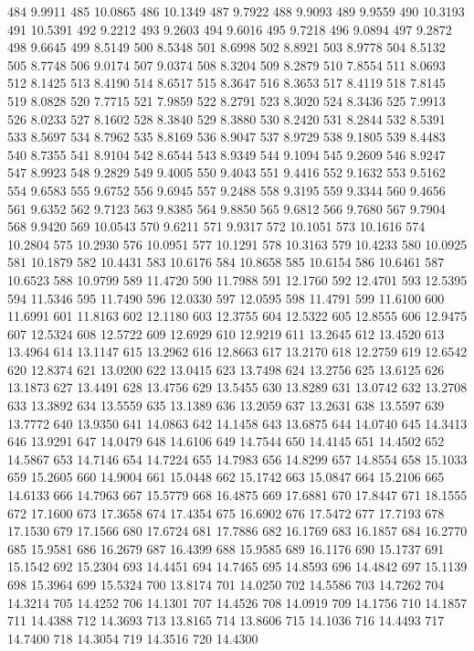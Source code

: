 484 9.9911
485 10.0865
486 10.1349
487 9.7922
488 9.9093
489 9.9559
490 10.3193
491 10.5391
492 9.2212
493 9.2603
494 9.6016
495 9.7218
496 9.0894
497 9.2872
498 9.6645
499 8.5149
500 8.5348
501 8.6998
502 8.8921
503 8.9778
504 8.5132
505 8.7748
506 9.0174
507 9.0374
508 8.3204
509 8.2879
510 7.8554
511 8.0693
512 8.1425
513 8.4190
514 8.6517
515 8.3647
516 8.3653
517 8.4119
518 7.8145
519 8.0828
520 7.7715
521 7.9859
522 8.2791
523 8.3020
524 8.3436
525 7.9913
526 8.0233
527 8.1602
528 8.3840
529 8.3880
530 8.2420
531 8.2844
532 8.5391
533 8.5697
534 8.7962
535 8.8169
536 8.9047
537 8.9729
538 9.1805
539 8.4483
540 8.7355
541 8.9104
542 8.6544
543 8.9349
544 9.1094
545 9.2609
546 8.9247
547 8.9923
548 9.2829
549 9.4005
550 9.4043
551 9.4416
552 9.1632
553 9.5162
554 9.6583
555 9.6752
556 9.6945
557 9.2488
558 9.3195
559 9.3344
560 9.4656
561 9.6352
562 9.7123
563 9.8385
564 9.8850
565 9.6812
566 9.7680
567 9.7904
568 9.9420
569 10.0543
570 9.6211
571 9.9317
572 10.1051
573 10.1616
574 10.2804
575 10.2930
576 10.0951
577 10.1291
578 10.3163
579 10.4233
580 10.0925
581 10.1879
582 10.4431
583 10.6176
584 10.8658
585 10.6154
586 10.6461
587 10.6523
588 10.9799
589 11.4720
590 11.7988
591 12.1760
592 12.4701
593 12.5395
594 11.5346
595 11.7490
596 12.0330
597 12.0595
598 11.4791
599 11.6100
600 11.6991
601 11.8163
602 12.1180
603 12.3755
604 12.5322
605 12.8555
606 12.9475
607 12.5324
608 12.5722
609 12.6929
610 12.9219
611 13.2645
612 13.4520
613 13.4964
614 13.1147
615 13.2962
616 12.8663
617 13.2170
618 12.2759
619 12.6542
620 12.8374
621 13.0200
622 13.0415
623 13.7498
624 13.2756
625 13.6125
626 13.1873
627 13.4491
628 13.4756
629 13.5455
630 13.8289
631 13.0742
632 13.2708
633 13.3892
634 13.5559
635 13.1389
636 13.2059
637 13.2631
638 13.5597
639 13.7772
640 13.9350
641 14.0863
642 14.1458
643 13.6875
644 14.0740
645 14.3413
646 13.9291
647 14.0479
648 14.6106
649 14.7544
650 14.4145
651 14.4502
652 14.5867
653 14.7146
654 14.7224
655 14.7983
656 14.8299
657 14.8554
658 15.1033
659 15.2605
660 14.9004
661 15.0448
662 15.1742
663 15.0847
664 15.2106
665 14.6133
666 14.7963
667 15.5779
668 16.4875
669 17.6881
670 17.8447
671 18.1555
672 17.1600
673 17.3658
674 17.4354
675 16.6902
676 17.5472
677 17.7193
678 17.1530
679 17.1566
680 17.6724
681 17.7886
682 16.1769
683 16.1857
684 16.2770
685 15.9581
686 16.2679
687 16.4399
688 15.9585
689 16.1176
690 15.1737
691 15.1542
692 15.2304
693 14.4451
694 14.7465
695 14.8593
696 14.4842
697 15.1139
698 15.3964
699 15.5324
700 13.8174
701 14.0250
702 14.5586
703 14.7262
704 14.3214
705 14.4252
706 14.1301
707 14.4526
708 14.0919
709 14.1756
710 14.1857
711 14.4388
712 14.3693
713 13.8165
714 13.8606
715 14.1036
716 14.4493
717 14.7400
718 14.3054
719 14.3516
720 14.4300
